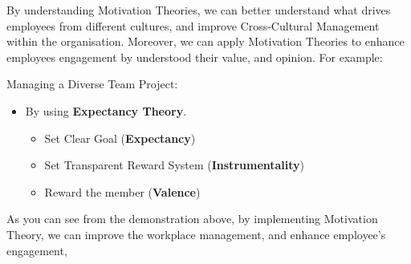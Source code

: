 \documentclass[11pt]{article}
\begin{document}
By understanding Motivation Theories, we can better understand what drives employees from different cultures, and improve Cross-Cultural Management within the organisation. Moreover, we can apply Motivation Theories to enhance employees engagement by understood their value, and opinion. For example:

Managing a Diverse Team Project:
\begin{itemize}
	\item By using \textbf{Expectancy Theory}.
	\begin{itemize}
		\item Set Clear Goal (\textbf{Expectancy})
		\item Set Transparent Reward System (\textbf{Instrumentality})
		\item Reward the member (\textbf{Valence})
	\end{itemize}
\end{itemize}
As you can see from the demonstration above, by implementing Motivation Theory, we can improve the workplace management, and enhance employee's engagement,
\end{document}
